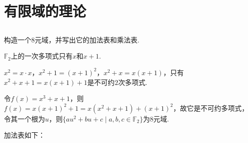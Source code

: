\section{有限域的理论}
\subsection{}
构造一个$8$元域，并写出它的加法表和乘法表.

\jie $\mathbb{F}_2$上的一次多项式只有$x$和$x+1$.

$x^2=x\cdot x$，$x^2+1=(x+1)^2$，$x^2+x=x(x+1)$，只有$x^2+x+1=x(x+1)+1$是不可约$2$次多项式.

令$f(x)=x^3+x+1$，则$f(x)=x(x+1)^2+1=x(x^2+x+1)+(x+1)^2$，故它是不可约多项式，令其一个根为$u$，则$\{au^2+bu+c\mid a,b,c\in\mathbb{F}_2\}$为$8$元域.

加法表如下：

